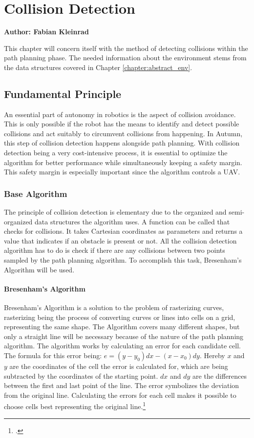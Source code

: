 \chapter{Collision Detection}
\label{chapter:collision_detection}

\textbf{Author: Fabian Kleinrad} 

This chapter will concern itself with the method of detecting collisions within the path planning phase. The needed information about the environment stems from the data structures covered in Chapter \ref{chapter:abstract_env}. 

\section{Fundamental Principle}
An essential part of autonomy in robotics is the aspect of collision avoidance. This is only possible if the robot has the means to identify and detect possible collisions and act suitably to circumvent collisions from happening.\newline
In Autumn, this step of collision detection happens alongside path planning. With collision detection being a very cost-intensive process, it is essential to optimize the algorithm for better performance while simultaneously keeping a safety margin. This safety margin is especially important since the algorithm controls a UAV. 

\subsection{Base Algorithm}
The principle of collision detection is elementary due to the organized and semi-organized data structures the algorithm uses. A function can be called that checks for collisions. It takes Cartesian coordinates as parameters and returns a value that indicates if an obstacle is present or not. All the collision detection algorithm has to do is check if there are any collisions between two points sampled by the path planning algorithm. To accomplish this task, Bresenham's Algorithm will be used.\newline

\subsubsection{Bresenham's Algorithm} 
Bresenham's Algorithm is a solution to the problem of rasterizing curves, rasterizing being the process of converting curves or lines into cells on a grid, representing the same shape. The Algorithm covers many different shapes, but only a straight line will be necessary because of the nature of the path planning algorithm.
The algorithm works by calculating an error for each candidate cell. The formula for this error being: $e=(y-y_0)dx-(x-x_0)dy$. Hereby $x$ and $y$ are the coordinates of the cell the error is calculated for, which are being subtracted by the coordinates of the starting point. $dx$ and $dy$ are the differences between the first and last point of the line.
The error symbolizes the deviation from the original line. Calculating the errors for each cell makes it possible to choose cells best representing the original line.\footcite{Zingl2012}

